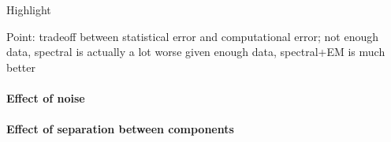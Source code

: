 Highlight




Point: tradeoff between statistical error and computational error;
not enough data, spectral is actually a lot worse
given enough data, spectral+EM is much better

\paragraph{Effect of noise}

\paragraph{Effect of separation between components}
